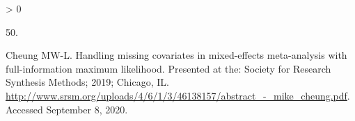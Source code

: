 \documentclass[
]{article}
\newlength{\cslhangindent}
\newlength{\csllabelwidth}
\newenvironment{CSLReferences}[2] %
 {%
  \setlength{\parindent}{0pt}
  \ifodd #1 \everypar{\setlength{\hangindent}{\cslhangindent}}\ignorespaces\fi
  \ifnum #2 > 0
  \setlength{\parskip}{#2\baselineskip}
  \fi
 }%
 {}
\newcommand{\CSLLeftMargin}[1]{\parbox[t]{\csllabelwidth}{#1}}
\newcommand{\CSLRightInline}[1]{\parbox[t]{\linewidth - \csllabelwidth}{#1}\break}
\begin{document}
\begin{CSLReferences}{0}{0}
\leavevmode\hypertarget{ref-cheungHandlingMissingCovariates2019}{}%
\CSLLeftMargin{50. }
\CSLRightInline{Cheung MW-L. Handling missing covariates in mixed-effects meta-analysis with full-information maximum likelihood. Presented at the: Society for Research Synthesis Methods; 2019; Chicago, IL. \url{http://www.srsm.org/uploads/4/6/1/3/46138157/abstract_-_mike_cheung.pdf}. Accessed September 8, 2020.}

\end{CSLReferences}
\end{document}
